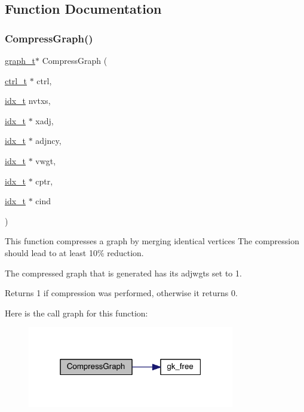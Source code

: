 \subsection{Function Documentation}
\mbox{\label{a00185_aa4d0e5c89a60679b517deddad368b686}} 
\subsubsection{\texorpdfstring{Compress\+Graph()}{CompressGraph()}}
{\footnotesize\ttfamily \hyperlink{a00734}{graph\+\_\+t}$\ast$ Compress\+Graph (\begin{DoxyParamCaption}\item[{\hyperlink{a00742}{ctrl\+\_\+t} $\ast$}]{ctrl,  }\item[{\hyperlink{a00876_aaa5262be3e700770163401acb0150f52}{idx\+\_\+t}}]{nvtxs,  }\item[{\hyperlink{a00876_aaa5262be3e700770163401acb0150f52}{idx\+\_\+t} $\ast$}]{xadj,  }\item[{\hyperlink{a00876_aaa5262be3e700770163401acb0150f52}{idx\+\_\+t} $\ast$}]{adjncy,  }\item[{\hyperlink{a00876_aaa5262be3e700770163401acb0150f52}{idx\+\_\+t} $\ast$}]{vwgt,  }\item[{\hyperlink{a00876_aaa5262be3e700770163401acb0150f52}{idx\+\_\+t} $\ast$}]{cptr,  }\item[{\hyperlink{a00876_aaa5262be3e700770163401acb0150f52}{idx\+\_\+t} $\ast$}]{cind }\end{DoxyParamCaption})}

This function compresses a graph by merging identical vertices The compression should lead to at least 10\% reduction.

The compressed graph that is generated has its adjwgts set to 1.

\begin{DoxyReturn}{Returns}
1 if compression was performed, otherwise it returns 0. 
\end{DoxyReturn}
Here is the call graph for this function\+:\nopagebreak
\begin{figure}[H]
\begin{center}
\leavevmode
\includegraphics[width=256pt]{a00185_aa4d0e5c89a60679b517deddad368b686_cgraph}
\end{center}
\end{figure}
\mbox{\label{a00185_afc11099daf13e5e24f17076daf471765}} 
